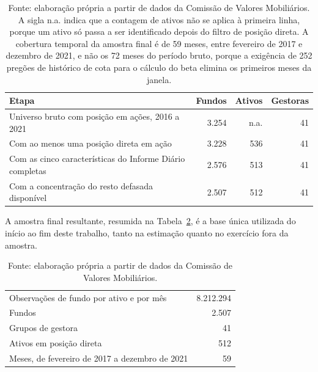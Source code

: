 \documentclass[12pt,a4paper]{article}
\begin{document}
\begin{table}[h]\centering\small
\caption{Funil da amostra, do universo bruto à amostra final.}
\label{tab:universo}
\begin{tabular}{@{}p{7.6cm}rrr@{}}
\toprule
Etapa & Fundos & Ativos & Gestoras \\
\midrule
Universo bruto com posição em ações, 2016 a 2021 & 3.254 & n.a. & 41 \\
Com ao menos uma posição direta em ação & 3.228 & 536 & 41 \\
Com as cinco características do Informe Diário completas & 2.576 & 513 & 41 \\
Com a concentração do resto defasada disponível & 2.507 & 512 & 41 \\
\bottomrule
\end{tabular}
\caption*{\footnotesize Fonte: elaboração própria a partir de dados da Comissão de Valores
Mobiliários. A sigla n.a. indica que a contagem de ativos não se aplica à primeira
linha, porque um ativo só passa a ser identificado depois do filtro de posição direta. A cobertura temporal da amostra final é
de 59 meses, entre fevereiro de 2017 e dezembro de 2021, e não os 72 meses do período bruto,
porque a exigência de 252 pregões de histórico de cota para o cálculo do beta elimina os
primeiros meses da janela.}
\end{table}

A amostra final resultante, resumida na Tabela~\ref{tab:amostra}, é a base única utilizada
do início ao fim deste trabalho, tanto na estimação quanto no exercício fora da amostra.

\begin{table}[h]\centering\small
\caption{Dimensões da amostra final.}
\label{tab:amostra}
\begin{tabular}{@{}lr@{}}
\toprule
Observações de fundo por ativo e por mês & 8.212.294 \\
Fundos & 2.507 \\
Grupos de gestora & 41 \\
Ativos em posição direta & 512 \\
Meses, de fevereiro de 2017 a dezembro de 2021 & 59 \\
\bottomrule
\end{tabular}
\caption*{\footnotesize Fonte: elaboração própria a partir de dados da Comissão de Valores
Mobiliários.}
\end{table}

\FloatBarrier

\clearpage
\end{document}
